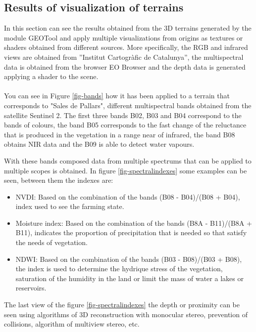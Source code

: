 \documentclass[10pt,a4paper,twocolumn,twoside]{article}
\begin{document}
\subsection{Results of visualization of terrains}
In this section can see the results obtained from the 3D terrains generated by the module GEOTool and apply multiple visualizations from origins as textures or shaders obtained from different sources. More specifically, the RGB and infrared views are obtained from ''Institut Cartogràfic de Catalunya'', the multispectral data is obtained from the browser EO Browser\cite{eobrowser} and the depth data is generated applying a shader to the scene.
\\
\\
You can see in Figure \ref{fig-bands} how it has been applied to a terrain that corresponds to "Sales de Pallars", different multispectral bands obtained from the satellite Sentinel 2\cite{sentinel2}. The first three bands B02, B03 and B04 correspond to the bands of colours, the band B05 corresponds to the fast change of the reluctance that is produced in the vegetation in a range near of infrared, the band B08 obtains NIR\cite{nir} data and the B09 is able to detect water vapours.

With these bands composed data from multiple spectrums that can be applied to multiple scopes is obtained. In figure \ref{fig-spectralindexes} some examples can be seen, between them the indexes are:

\begin{itemize}
\item 
{
	NVDI\cite{ndvi}: Based on the combination of the bands (B08 - B04)/(B08 + B04), index used to see the farming state.
}
\item
{
	Moisture index\cite{moisture}: Based on the combination of the bands (B8A - B11)/(B8A + B11), indicates the proportion of precipitation that is needed so that satisfy the needs of vegetation.
}
\item
{
	NDWI\cite{ndwi}: Based on the combination of the bands (B03 - B08)/(B03 + B08), the index is used to determine the hydrique stress of the vegetation, saturation of the humidity in the land or limit the mass of water a lakes or reservoirs.
}
\end{itemize} 

The last view of the figure \ref{fig-spectralindexes} the depth or proximity can be seen using  algorithms of 3D reconstruction with monocular stereo, prevention of collisions, algorithm of multiview stereo, etc.
\end{document}
